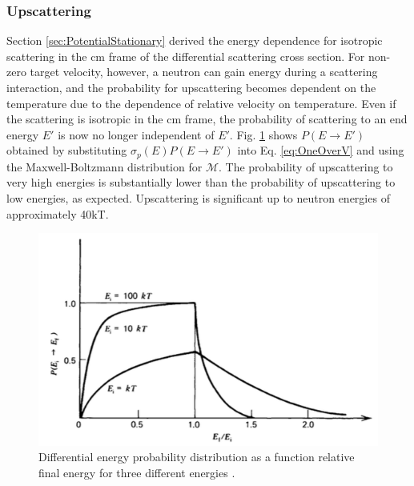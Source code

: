 \subsubsection{Upscattering}

Section \ref{sec:PotentialStationary} derived the energy dependence for isotropic scattering in the \gls{cm} frame of the differential scattering cross section. For non-zero target velocity, however, a neutron can gain energy during a scattering interaction, and the probability for upscattering becomes dependent on the temperature due to the dependence of relative velocity on temperature. Even if the scattering is isotropic in the \gls{cm} frame, the probability of scattering to an end energy \(E'\) is now no longer independent of \(E'\). Fig. \ref{fig:upscattering} shows \(P(E\rightarrow E')\) obtained by substituting \(\sigma_p(E)P(E\rightarrow E')\) into Eq. \eqref{eq:OneOverV} and using the Maxwell-Boltzmann distribution for \(\mathscr{M}\). The probability of upscattering to very high energies is substantially lower than the probability of upscattering to low energies, as expected. Upscattering is significant up to neutron energies of approximately 40kT. 


\begin{figure}[H]
\centering
\includegraphics[width=0.5\linewidth]{figures/upscattering.png}
\caption{Differential energy probability distribution as a function relative final energy for three different energies \cite{duderstadt}.}
\label{fig:upscattering}
\end{figure}
